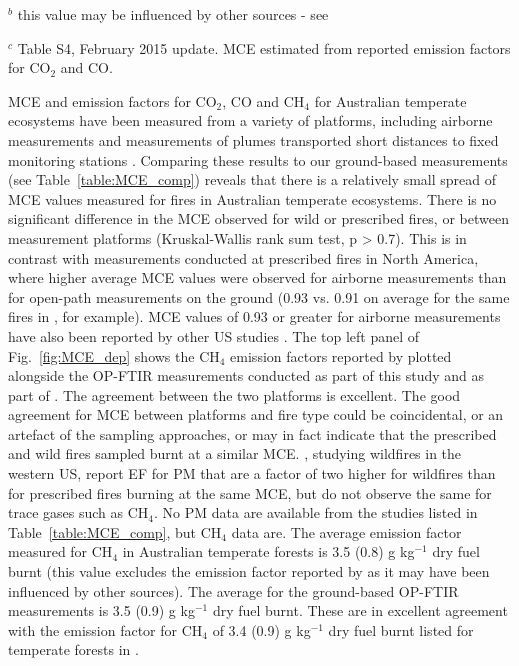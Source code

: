 \documentclass[acp, manuscript]{copernicus}
\begin{document}
\begin{table}
{$^b$ this value may be influenced by other sources - see \citet{Rea2016}

$^c$ Table S4, February 2015 update. MCE estimated from reported emission factors for CO$_2$ and CO. 
} %
 \label{table:MCE_comp}
\end{table}


MCE and emission factors for CO$_2$, CO and CH$_4$ for Australian temperate ecosystems have been measured from a variety of platforms, including airborne measurements \citep{Hurst1996} and measurements of plumes transported short distances to fixed monitoring stations \citep{Lawson2015,Rea2016}. Comparing these results to our ground-based measurements (see Table~\ref{table:MCE_comp}) reveals that there is a relatively small spread of MCE values measured for fires in Australian temperate ecosystems. %
 There is no significant difference in the MCE observed for wild or prescribed fires, or between measurement platforms (Kruskal-Wallis rank sum test, p > 0.7). This is in contrast with measurements conducted at prescribed fires in North America, where higher average MCE values were observed for airborne measurements than for open-path measurements on the ground (0.93 vs. 0.91 on average for the same fires in \citet{Akagi2014}, for example). MCE values of 0.93 or greater for airborne measurements have also been reported by other US studies \citep{Burling2011, Akagi2013}. The top left panel of Fig.~\ref{fig:MCE_dep} shows the CH$_4$ emission factors reported by \citet{Hurst1996} plotted alongside the OP-FTIR measurements conducted as part of this study and as part of \citet{Paton-Walsh2014}. The agreement between the two platforms is excellent. 
The good agreement for MCE between platforms and fire type could be coincidental, or an artefact of the sampling approaches, or may in fact indicate that the prescribed and wild fires sampled burnt at a similar MCE.  \citet{Liu2017}, studying wildfires in the western US, report EF for PM that are a factor of two higher for wildfires than for prescribed fires burning at the same MCE, but do not observe the same for trace gases such as CH$_4$.  
 No PM data are available from the studies listed in Table~\ref{table:MCE_comp}, but CH$_4$ data are. The average emission factor measured for CH$_4$ in Australian temperate forests is 3.5 (0.8) g kg$^{-1}$ dry fuel burnt (this value excludes the emission factor reported by \citet{Rea2016} as it may have been influenced by other sources). The average for the ground-based OP-FTIR measurements is 3.5 (0.9) g kg$^{-1}$ dry fuel burnt. These are in excellent agreement with the emission factor for CH$_4$  of 3.4 (0.9) g kg$^{-1}$ dry fuel burnt listed for temperate forests in \citet[Table S4, February 2015 update]{Akagi2011}. 
\end{document}
